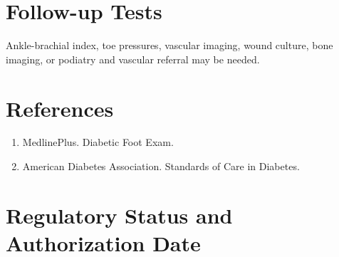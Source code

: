 \section*{Follow-up Tests} Ankle-brachial index, toe pressures, vascular imaging, wound culture, bone imaging, or podiatry and vascular referral may be needed.
\section*{References} \begin{enumerate}\item MedlinePlus. Diabetic Foot Exam.\item American Diabetes Association. Standards of Care in Diabetes.\end{enumerate}
\clearpage\section*{Regulatory Status and Authorization Date}\clearpage
